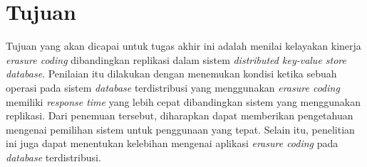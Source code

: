 \section{Tujuan}
\label{sec:tujuans}

Tujuan yang akan dicapai untuk tugas akhir ini adalah menilai kelayakan kinerja \textit{erasure coding} dibandingkan replikasi dalam sistem \textit{distributed key-value store database}. Penilaian itu dilakukan dengan menemukan kondisi ketika sebuah operasi pada sistem \textit{database} terdistribusi yang menggunakan \textit{erasure coding} memiliki \textit{response time} yang lebih cepat dibandingkan sistem yang menggunakan replikasi. Dari penemuan tersebut, diharapkan dapat memberikan pengetahuan mengenai pemilihan sistem untuk penggunaan yang tepat. Selain itu, penelitian ini juga dapat menentukan kelebihan mengenai aplikasi \textit{erasure coding} pada \textit{database} terdistribusi.